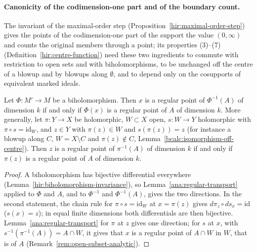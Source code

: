 \paragraph{Canonicity of the codimension-one part and of the boundary count.} The invariant of the maximal-order step
(Proposition~\ref{hir:maximal-order-step}) gives the points of the codimension-one part of the support the value \((0,\infty)\) and counts the original members
through a point; its properties (3)--(7) (Definition~\ref{hir:centre-function}) need these two ingredients to commute with restriction to open sets and with
biholomorphisms, to be unchanged off the centre of a blowup and by blowups along \(\emptyset\), and to depend only on the cosupports of equivalent marked ideals.

\begin{lemma}
\label{bcalc:regular-point-transport}
\leanok
Let \(\Phi\colon M'\to M\) be a biholomorphism. Then \(x\) is a regular point of \(\Phi^{-1}(A)\) of dimension \(k\) if and only if \(\Phi(x)\) is a regular point
of \(A\) of dimension \(k\). More generally, let \(\pi\colon Y\to X\) be holomorphic, \(W\subset X\) open, \(s\colon W\to Y\) holomorphic with \(\pi\circ s=\mathrm{id}_W\),
and \(z\in Y\) with \(\pi(z)\in W\) and \(s(\pi(z))=z\) (for instance a blowup along \(C\), \(W=X\setminus C\) and \(\pi(z)\notin C\),
Lemma~\ref{bcalc:isomorphism-off-centre}). Then \(z\) is a regular point of \(\pi^{-1}(A)\) of dimension \(k\) if and only if \(\pi(z)\) is a regular point of \(A\)
of dimension \(k\).
\end{lemma}
\begin{proof}
\leanok
A biholomorphism has bijective differential everywhere (Lemma~\ref{hir:biholomorphism-invariance}), so Lemma~\ref{ana:regular-transport} applied to \(\Phi\) and
\(A\), and to \(\Phi^{-1}\) and \(\Phi^{-1}(A)\), gives the two directions. In the second statement, the chain rule for \(\pi\circ s=\mathrm{id}_W\) at
\(x=\pi(z)\) gives \(d\pi_z\circ ds_x=\mathrm{id}\) (\(s(x)=z\)); in equal finite dimensions both differentials are then bijective. Lemma~\ref{ana:regular-transport}
for \(\pi\) at \(z\) gives one direction; for \(s\) at \(x\), with \(s^{-1}(\pi^{-1}(A))=A\cap W\), it gives that \(x\) is a regular point of \(A\cap W\) in \(W\), that is
of \(A\) (Remark~\ref{rem:open-subset-analytic}).
\end{proof}

